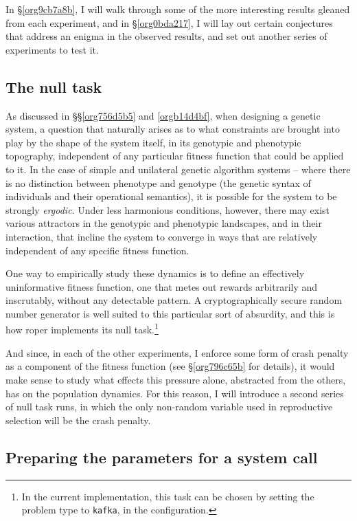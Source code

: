 \documentclass[12pt,glossary]{dalthesis}
\begin{document}
In \S \ref{org9cb7a8b}, I will walk through some of the more interesting results
gleaned from each experiment, and in \S \ref{org0bda217}, I will lay out certain
conjectures that address an enigma in the observed results, and set out another
series of experiments to test it. 

\subsection{The null task}
\label{sec:orgacd2bd7}
\label{org8b5b12d}

As discussed in \S\S \ref{org756d5b5} and \ref{orgb14d4bf}, when designing a genetic
system, a question that naturally arises as to what constraints are brought into
play by the shape of the system itself, in its genotypic and phenotypic topography,
independent of any particular fitness function that could be applied to it. In the
case of simple and unilateral genetic algorithm systems -- where there is no distinction
between phenotype and genotype (the genetic syntax of individuals and their 
operational semantics), it is possible for the system to be strongly \emph{ergodic}.
Under less harmonious conditions, however, there may exist various attractors in
the genotypic and phenotypic landscapes, and in their interaction, that incline
the system to converge in ways that are relatively independent of any specific
fitness function. 

One way to empirically study these dynamics is to define an
effectively uninformative fitness function, one that metes out rewards arbitrarily
and inscrutably, without any detectable pattern. A cryptographically secure
random number generator is well suited to this particular sort of absurdity, and
this is how \gls{roper} implements its null task.\footnote{In the current implementation, this task can be chosen by setting the 
  problem type to \texttt{kafka}, in the configuration.} 

And since, in each of the other experiments, I enforce some form of crash penalty
as a component of the fitness function (see \S \ref{org796c65b} for details),
it would make sense to study what effects this pressure alone, abstracted from
the others, has on the population dynamics. For this reason, I will introduce
a second series of null task runs, in which the only non-random variable used
in reproductive selection will be the crash penalty. 

\subsection{Preparing the parameters for a system call}
\label{sec:org333ab65}
\label{org3a35742}
\end{document}
